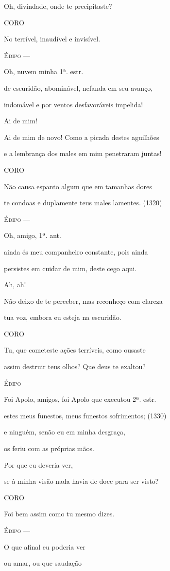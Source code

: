 Oh, divindade, onde te precipitaste?

\textsc{CORO}

No terrível, inaudível e invisível.

\textsc{Édipo} ---

Oh, nuvem minha 1ª. estr.

de escuridão, abominável, nefanda em seu avanço,

indomável e por ventos desfavoráveis impelida!

Ai de mim!

Ai de mim de novo! Como a picada destes aguilhões

e a lembrança dos males em mim penetraram juntas!

\textsc{CORO}

Não causa espanto algum que em tamanhas dores

te condoas e duplamente teus males lamentes. (1320)

\textsc{Édipo} ---

Oh, amigo, 1ª. ant.

ainda és meu companheiro constante, pois ainda

persistes em cuidar de mim, deste cego aqui.

Ah, ah!

Não deixo de te perceber, mas reconheço com clareza

tua voz, embora eu esteja na escuridão.

\textsc{CORO}

Tu, que cometeste ações terríveis, como ousaste

assim destruir teus olhos? Que deus te exaltou?

\textsc{Édipo} ---

Foi Apolo, amigos, foi Apolo que executou 2ª. estr.

estes meus funestos, meus funestos sofrimentos; (1330)

e ninguém, senão eu em minha desgraça,

os feriu com as próprias mãos.

Por que eu deveria ver,

se à minha visão nada havia de doce para ser visto?

\textsc{CORO}

Foi bem assim como tu mesmo dizes.

\textsc{Édipo} ---

O que afinal eu poderia ver

ou amar, ou que saudação

